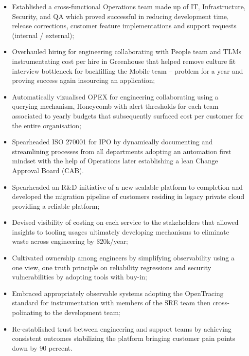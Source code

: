 \documentclass[11pt,a4paper,nolmodern,colorlinks=true,linkcolor=true]{moderncv}
\begin{document}
%
  {
    \begin{itemize}
      \item Established a cross-functional Operations team made up of IT, Infrastructure, Security, and QA which proved successful in reducing development time, release corrections, customer feature implementations and support requests (internal / external);
      \item Overhauled hiring for engineering collaborating with People team and TLMs instrumentating cost per hire in Greenhouse that helped remove culture fit interview bottleneck for backfilling the Mobile team -- problem for a year and proving success again insourcing an application;
      \item Automatically vizualised OPEX for engineering collaborating using a querying mechanism, Honeycomb with alert thresholds for each team associated to yearly budgets that subsequently surfaced cost per customer for the entire organisation;
      \item Spearheaded ISO 270001 for IPO by dynamically documenting and streamlining processes from all departments adopting an automation first mindset with the help of Operations later establishing a lean Change Approval Board (CAB).
    \end{itemize}
}

%
  {
    \begin{itemize}
      \item Spearheaded an R\&D initiative of a new scalable platform to completion and developed the migration pipeline of customers residing in legacy private cloud providing a reliable platform;
      \item Devised visibility of costing on each service to the stakeholders that allowed insights to tooling usages ultimately developing mechanisms to eliminate waste across engineering by \$20k/year;
      \item Cultivated ownership among engineers by simplifying observability using a one view, one truth principle on reliability regressions and security vulnerabilities by adopting tools with buy-in;
      \item Embraced appropriately observable systems adopting the OpenTracing standard for instrumentation with members of the SRE team then cross-polinating to the development team;
      \item Re-established trust between engineering and support teams by achieving consistent outcomes stabilizing the platform bringing customer pain points down by 90 percent.
    \end{itemize}
}
\end{document}
